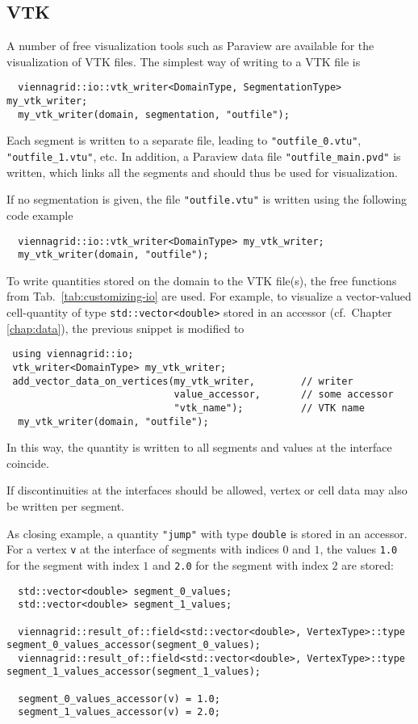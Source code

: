 
 \subsection{VTK}
 A number of free visualization tools such as Paraview \cite{paraview} are available for the visualization of VTK files.
 The simplest way of writing to a VTK file is 
 \begin{lstlisting}
  viennagrid::io::vtk_writer<DomainType, SegmentationType> my_vtk_writer;
  my_vtk_writer(domain, segmentation, "outfile");
 \end{lstlisting}
 Each segment is written to a separate file, leading to \lstinline|"outfile_0.vtu"|, \lstinline|"outfile_1.vtu"|, etc. In addition,
 a Paraview data file \lstinline|"outfile_main.pvd"| is written, which links all the segments and should thus be used for visualization.
 
 If no segmentation is given, the file \lstinline|"outfile.vtu"| is written using the following code example
 \begin{lstlisting}
  viennagrid::io::vtk_writer<DomainType> my_vtk_writer;
  my_vtk_writer(domain, "outfile");
 \end{lstlisting}

 To write quantities stored on the domain to the VTK file(s), the free functions from Tab.~\ref{tab:customizing-io} are used.
 For example, to visualize a vector-valued cell-quantity of type \lstinline|std::vector<double>| stored in an accessor (cf.~Chapter \ref{chap:data}), the previous snippet is modified to
 \begin{lstlisting}
 using viennagrid::io;
 vtk_writer<DomainType> my_vtk_writer;
 add_vector_data_on_vertices(my_vtk_writer,        // writer
                             value_accessor,       // some accessor
                             "vtk_name");          // VTK name
  my_vtk_writer(domain, "outfile");
 \end{lstlisting}
 In this way, the quantity is written to all segments and values at the interface coincide.

 If discontinuities at the interfaces should be allowed, vertex or cell data may also be written per segment.
 
 As closing example, a quantity \lstinline|"jump"| with type \lstinline|double| is stored in an accessor.
 For a vertex \lstinline|v| at the interface of segments with indices $0$ and $1$, the values \lstinline|1.0| for the segment with index $1$ and \lstinline|2.0| for the segment with index $2$ are stored:
 \begin{lstlisting}
  std::vector<double> segment_0_values;
  std::vector<double> segment_1_values;
  
  viennagrid::result_of::field<std::vector<double>, VertexType>::type segment_0_values_accessor(segment_0_values);
  viennagrid::result_of::field<std::vector<double>, VertexType>::type segment_1_values_accessor(segment_1_values);
 
  segment_0_values_accessor(v) = 1.0;
  segment_1_values_accessor(v) = 2.0;
 \end{lstlisting}
 
